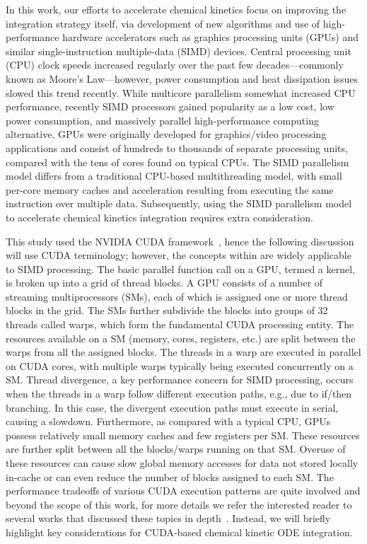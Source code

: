 \documentclass[preprint]{elsarticle}
\begin{document}
In this work, our efforts to accelerate chemical kinetics focus on improving the integration strategy itself, via development of new algorithms and use of high-performance hardware accelerators such as graphics processing units (GPUs) and similar single-instruction multiple-data (SIMD) devices.
Central processing unit (CPU) clock speeds increased regularly over the past few decades---commonly known as Moore's Law---however, power consumption and heat dissipation issues slowed this trend recently.
While multicore parallelism somewhat increased CPU performance, recently SIMD processors gained popularity as a low cost, low power consumption, and massively parallel high-performance computing alternative.
GPUs were originally developed for graphics\slash video processing applications and consist of hundreds to thousands of separate processing units, compared with the tens of cores found on typical CPUs.
The SIMD parallelism model differs from a traditional CPU-based multithreading model, with small per-core memory caches and acceleration resulting from executing the same instruction over multiple data.
Subsequently, using the SIMD parallelism model to accelerate chemical kinetics integration requires extra consideration.

This study used the NVIDIA CUDA framework~\cite{Buck:2008aa,NVIDIA:2015aa}, hence the following discussion will use CUDA terminology; however, the concepts within are widely applicable to SIMD processing.
The basic parallel function call on a GPU, termed a kernel, is broken up into a grid of thread blocks.
A GPU consists of a number of streaming multiprocessors (SMs), each of which is assigned one or more thread blocks in the grid.
The SMs further subdivide the blocks into groups of \num{32} threads called warps, which form the fundamental CUDA processing entity.
The resources available on a SM (memory, cores, registers, etc.) are split between the warps from all the assigned blocks.
The threads in a warp are executed in parallel on CUDA cores, with multiple warps typically being executed concurrently on a SM.
Thread divergence, a key performance concern for SIMD processing, occurs when the threads in a warp follow different execution paths, e.g., due to if\slash then branching.
In this case, the divergent execution paths must execute in serial, causing a slowdown.
Furthermore, as compared with a typical CPU, GPUs possess relatively small memory caches and few registers per SM.
These resources are further split between all the blocks\slash warps running on that SM.
Overuse of these resources can cause slow global memory accesses for data not stored locally in-cache or can even reduce the number of blocks assigned to each SM.
The performance tradeoffs of various CUDA execution patterns are quite involved and beyond the scope of this work, for more details we refer the interested reader to several works that discussed these topics in depth~\cite{Cruz:2011gc,Brodtkorb:2013hn,Niemeyer:2014hn}.
Instead, we will briefly highlight key considerations for CUDA-based chemical kinetic ODE integration.
\end{document}
